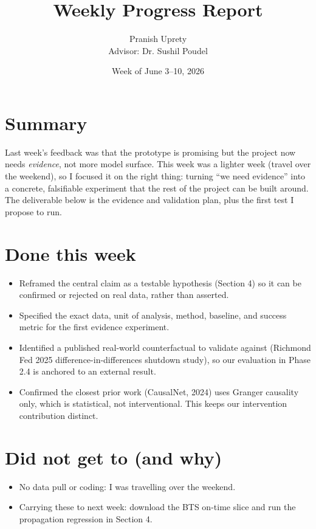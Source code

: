 \documentclass[11pt]{article}
\title{Weekly Progress Report}
\author{Pranish Uprety \\ Advisor: Dr. Sushil Poudel}
\date{Week of June 3--10, 2026}
\begin{document}
\maketitle

\section{Summary}
Last week's feedback was that the prototype is promising but the project now
needs \emph{evidence}, not more model surface. This week was a lighter week
(travel over the weekend), so I focused it on the right thing: turning
``we need evidence'' into a concrete, falsifiable experiment that the rest of
the project can be built around. The deliverable below is the evidence and
validation plan, plus the first test I propose to run.

\section{Done this week}
\begin{itemize}[leftmargin=*]
  \item Reframed the central claim as a testable hypothesis (Section 4) so it
        can be confirmed or rejected on real data, rather than asserted.
  \item Specified the exact data, unit of analysis, method, baseline, and
        success metric for the first evidence experiment.
  \item Identified a published real-world counterfactual to validate against
        (Richmond Fed 2025 difference-in-differences shutdown study), so our
        evaluation in Phase 2.4 is anchored to an external result.
  \item Confirmed the closest prior work (CausalNet, 2024) uses Granger
        causality only, which is statistical, not interventional. This keeps
        our intervention contribution distinct.
\end{itemize}

\section{Did not get to (and why)}
\begin{itemize}[leftmargin=*]
  \item No data pull or coding: I was travelling over the weekend.
  \item Carrying these to next week: download the BTS on-time slice and run
        the propagation regression in Section 4.
\end{itemize}
\end{document}
